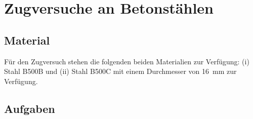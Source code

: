 %



\newcommand{\blattname}{Zugversuche an Betonstählen}



\section*{\blattname}
\subsection*{Material}

Für den Zugversuch stehen die folgenden beiden Materialien zur Verfügung: (i) Stahl B500B und (ii) Stahl B500C mit einem Durchmesser von \SI{16}{\mm} zur Verfügung.

\subsection*{Aufgaben}


